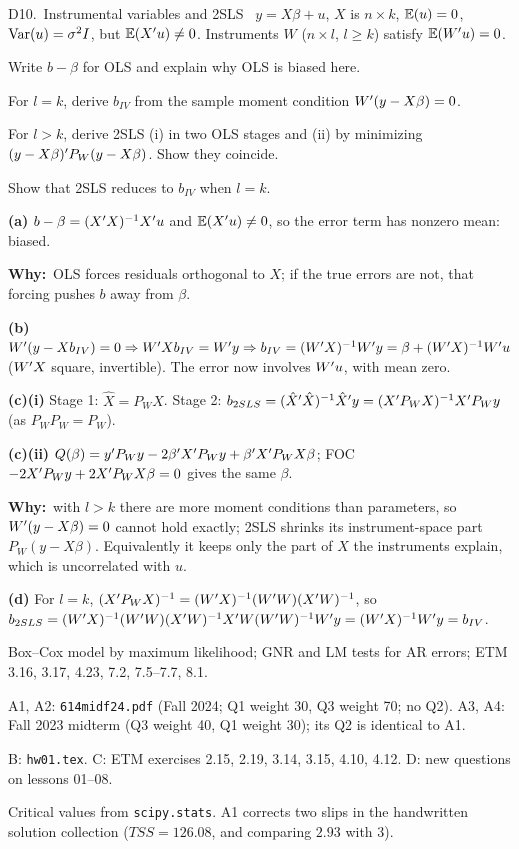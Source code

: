 \documentclass[11pt]{article}
\newcommand{\tagbox}[2]{\tcbox[on line, colback=#1, colframe=#1, coltext=white,
  boxsep=1pt, left=3pt, right=3pt, top=0pt, bottom=0pt, arc=1.5pt]{\scriptsize\sffamily\bfseries #2}}
\newcommand{\likely}{\tagbox{likelyor}{$\star\star$ LIKELY}}
\newcommand{\newtag}{\tagbox{qnavy!60}{NEW}}
\newcommand{\step}[1]{\par\smallskip\noindent\textbf{\textcolor{qnavy}{#1}}\quad\ignorespaces}
\newcommand{\Why}{\textbf{\textcolor{whyline}{Why:}}\ }
\begin{document}
\begin{qbox}{D10.\ Instrumental variables and 2SLS}{\likely\ \newtag}
$y=X\beta+u$, $X$ is $n\times k$, $\mathbb{E}(u)=0$, $\operatorname{Var}(u)=\sigma^{2}I$, but $\mathbb{E}(X^{\prime} u)\ne0$. Instruments $W$ ($n\times l$, $l\ge k$) satisfy $\mathbb{E}(W^{\prime} u)=0$.
\begin{flatlist}
  \item[(a)] Write $b-\beta$ for OLS and explain why OLS is biased here.
  \item[(b)] For $l=k$, derive $b_{IV}$ from the sample moment condition $W^{\prime}(y-X\beta)=0$.
  \item[(c)] For $l>k$, derive 2SLS (i) in two OLS stages and (ii) by minimizing $(y-X\beta)^{\prime} P_{W}(y-X\beta)$. Show they coincide.
  \item[(d)] Show that 2SLS reduces to $b_{IV}$ when $l=k$.
\end{flatlist}
\end{qbox}
\begin{solbox}
\step{(a)} $b-\beta=(X^{\prime} X)^{-1}X^{\prime} u$ and $\mathbb{E}(X^{\prime} u)\ne0$, so the error term has nonzero mean: biased.
\begin{why}\Why OLS forces residuals orthogonal to $X$; if the true errors are not, that forcing pushes $b$ away from $\beta$.\end{why}
\step{(b)} $W^{\prime}(y-Xb_{IV})=0\Rightarrow W^{\prime} Xb_{IV}=W^{\prime} y\Rightarrow b_{IV}=(W^{\prime} X)^{-1}W^{\prime} y=\beta+(W^{\prime} X)^{-1}W^{\prime} u$ ($W^{\prime} X$ square, invertible). The error now involves $W^{\prime} u$, with mean zero.
\step{(c)(i)} Stage 1: $\hat X=P_{W}X$. Stage 2: $b_{2SLS}=(\hat X^{\prime}\hat X)^{-1}\hat X^{\prime} y=(X^{\prime} P_{W}X)^{-1}X^{\prime} P_{W}y$ (as $P_{W}P_{W}=P_{W}$).
\step{(c)(ii)} $Q(\beta)=y^{\prime} P_{W}y-2\beta^{\prime} X^{\prime} P_{W}y+\beta^{\prime} X^{\prime} P_{W}X\beta$; FOC $-2X^{\prime} P_{W}y+2X^{\prime} P_{W}X\beta=0$ gives the same $\beta$.
\begin{why}\Why with $l>k$ there are more moment conditions than parameters, so $W^{\prime}(y-X\beta)=0$ cannot hold exactly; 2SLS shrinks its instrument-space part $P_{W}(y-X\beta)$.
Equivalently it keeps only the part of $X$ the instruments explain, which is uncorrelated with $u$.\end{why}
\step{(d)} For $l=k$, $(X^{\prime} P_{W}X)^{-1}=(W^{\prime} X)^{-1}(W^{\prime} W)(X^{\prime} W)^{-1}$, so
$b_{2SLS}=(W^{\prime} X)^{-1}(W^{\prime} W)(X^{\prime} W)^{-1}X^{\prime} W(W^{\prime} W)^{-1}W^{\prime} y=(W^{\prime} X)^{-1}W^{\prime} y=b_{IV}$.
\end{solbox}

{\small Box--Cox model by maximum likelihood; GNR and LM tests for AR errors; ETM 3.16, 3.17, 4.23, 7.2, 7.5--7.7, 8.1.}

\begin{transcriptnotes}
  \item A1, A2: \texttt{614midf24.pdf} (Fall 2024; Q1 weight 30, Q3 weight 70; no Q2). A3, A4: Fall 2023 midterm (Q3 weight 40, Q1 weight 30); its Q2 is identical to A1.
  \item B: \texttt{hw01.tex}. C: ETM exercises 2.15, 2.19, 3.14, 3.15, 4.10, 4.12. D: new questions on lessons 01--08.
  \item Critical values from \texttt{scipy.stats}. A1 corrects two slips in the handwritten solution collection ($TSS=126.08$, and comparing $2.93$ with $3$).
\end{transcriptnotes}
\end{document}
